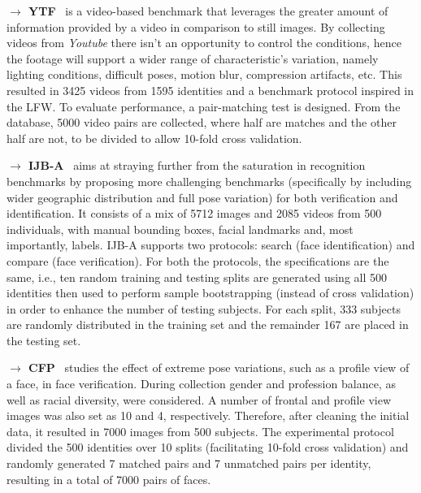 \documentclass[class=report, crop=false, a4paper, 12pt]{standalone}
\begin{document}
\vspace{0.7\baselineskip}
\noindent\textbf{$\rightarrow$ YTF}~\autocite{wolfFaceRecognitionUnconstrained2011} is a video-based benchmark that leverages the greater amount of information provided by a video in comparison to still images. By collecting videos from \textit{Youtube} there isn't an opportunity to control the conditions, hence the footage will support a wider range of characteristic's variation, namely lighting conditions, difficult poses, motion blur, compression artifacts, etc. This resulted in 3425 videos from 1595 identities and a benchmark protocol inspired in the LFW. To evaluate performance, a pair-matching test is designed. From the database, 5000 video pairs are collected, where half are matches and the other half are not, to be divided to allow 10-fold cross validation.

\vspace{0.7\baselineskip}
\noindent\textbf{$\rightarrow$ IJB-A}~\autocite{klarePushingFrontiersUnconstrained2015} aims at straying further from the saturation in recognition benchmarks by proposing more challenging benchmarks (specifically by including wider geographic distribution and full pose variation) for both verification and identification. It consists of a mix of 5712 images and 2085 videos from 500 individuals, with manual bounding boxes, facial landmarks and, most importantly, labels. IJB-A supports two protocols: search (face identification) and compare (face verification). For both the protocols, the specifications are the same, i.e., ten random training and testing splits are generated using all 500 identities then used to perform sample bootstrapping (instead of cross validation) in order to enhance the number of testing subjects. For each split, 333 subjects are randomly distributed in the training set and the remainder 167 are placed in the testing set.

\vspace{0.7\baselineskip}
\noindent\textbf{$\rightarrow$ CFP}~\autocite{senguptaFrontalProfileFace2016} studies the effect of extreme pose variations, such as a profile view of a face, in face verification. During collection gender and profession balance, as well as racial diversity, were considered. A number of frontal and profile view images was also set as 10 and 4, respectively. Therefore, after cleaning the initial data, it resulted in 7000 images from 500 subjects. The experimental protocol divided the 500 identities over 10 splits (facilitating 10-fold cross validation) and randomly generated 7 matched pairs and 7 unmatched pairs per identity, resulting in a total of 7000 pairs of faces.
\end{document}
